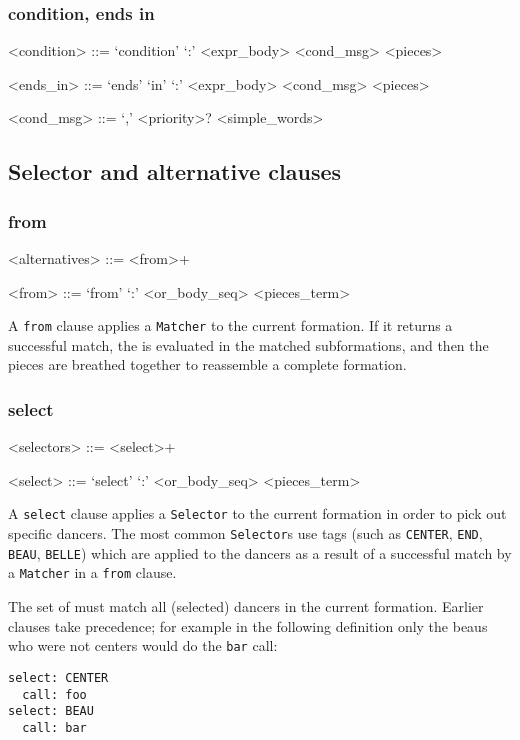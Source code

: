 \documentclass[12pt]{article}
\newcommand{\clause}[1]{\texttt{#1}}
\renewcommand{\call}[1]{\texttt{#1}} %
\begin{document}
\subsubsection{condition, ends in}
\begin{grammar}
<condition> ::= `condition' `:' <expr_body> <cond_msg> <pieces>

<ends_in> ::= `ends' `in' `:' <expr_body> <cond_msg> <pieces>

<cond_msg> ::= `,' <priority>? <simple_words>
\end{grammar}

\subsection{Selector and alternative clauses}
\subsubsection{from}
\begin{grammar}
<alternatives> ::= <from>+

<from> ::= `from' `:' <or_body_seq> <pieces_term>
\end{grammar}

A \clause{from} clause applies a \texttt{Matcher} to the current
formation.  If it returns a successful match, the
 is evaluated in the matched subformations,
and then the pieces are breathed together to reassemble a
complete formation.

\subsubsection{select}
\begin{grammar}
<selectors> ::= <select>+

<select> ::= `select' `:' <or_body_seq> <pieces_term>
\end{grammar}

A \clause{select} clause applies a \texttt{Selector} to the current
formation in order to pick out specific dancers.  The most common
\texttt{Selector}s use tags (such as \texttt{CENTER}, \texttt{END},
\texttt{BEAU}, \texttt{BELLE}) which are applied to the dancers as
a result of a successful match by a \texttt{Matcher} in a
\clause{from} clause.

The set of  must match all (selected) dancers in the
current formation.  Earlier  clauses take
precedence; for example in the following definition only the beaus who
were not centers would do the \call{bar} call:
\begin{lstlisting}
select: CENTER
  call: foo
select: BEAU
  call: bar
\end{lstlisting}
\end{document}
